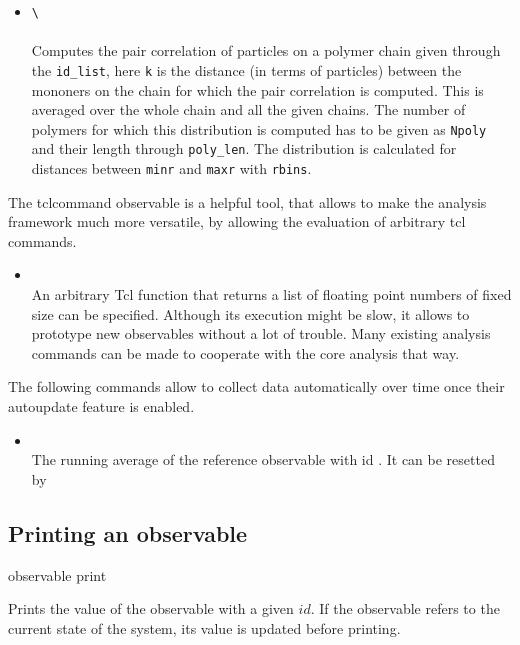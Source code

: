 \begin{itemize}
{		<cut\_off>} \\
		Calculates the persistence length of the given polymer specified through the
		\verb!id_list!. \verb!max_d! is the maximum distance (in terms of particles) for
		which the correlation is computed. With \verb!cut_off! the number of
		particles at the polymer ends that are ignored for the calculation, can be
		specified. 
	\item {} \verb!\!\\
		 \\
		Computes the pair correlation of particles on a polymer chain given through
		the \verb!id_list!, here \verb!k! is the distance (in terms of particles) between
		the mononers on the chain for which the pair correlation is computed. This
		is averaged over the whole chain and all the given chains. The number of
		polymers for which this distribution is computed has to be given as
		\verb!Npoly! and their length through \verb!poly_len!. The distribution is
		calculated for distances between \verb!minr! and \verb!maxr! with
		\verb!rbins!. 
      \end{itemize}
The tclcommand observable is a helpful tool, that allows to make the 
analysis framework much more versatile, by allowing
the evaluation of arbitrary tcl commands.
  \begin{itemize}
    \item {} \\
        An arbitrary Tcl function that returns a list of floating point numbers of fixed size
         can be specified. Although its execution might be slow, it allows 
        to prototype new observables without a lot of trouble.
        Many existing analysis commands can be made to cooperate with the core analysis that way.
  \end{itemize}
The following commands allow to collect data automatically over time
once their autoupdate feature is enabled.

  \begin{itemize}
    \item {} \\
      The running average of the reference observable with id . 
      It can be resetted by 
  \end{itemize}
\subsection{Printing an observable}
\begin{essyntax}
observable  print 
\end{essyntax}
Prints the value of the observable with a given $id$. If the observable
refers to the current state of the system, its value is updated before printing.

